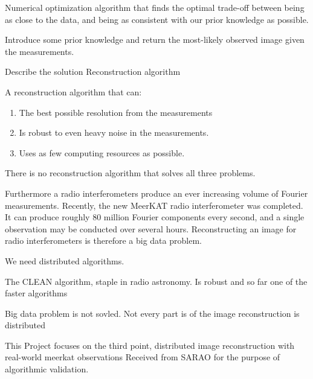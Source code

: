 Numerical optimization algorithm that finds the optimal trade-off between being as close to the data, and being as consistent with our prior knowledge as possible.

Introduce some prior knowledge and return the most-likely observed image given the measurements.

Describe the solution
Reconstruction algorithm


A reconstruction algorithm that can:
\begin{enumerate}
	\item The best possible resolution from the measurements
	\item Is robust to even heavy noise in the measurements.
	\item Uses as few computing resources as possible.
\end{enumerate}

There is no reconstruction algorithm that solves all three problems.

Furthermore a radio interferometers produce an ever increasing volume of Fourier measurements. Recently, the new MeerKAT radio interferometer was completed. It can produce roughly 80 million Fourier components every second, and a single observation may be conducted over several hours. Reconstructing an image for radio interferometers is therefore a big data problem.


We need distributed algorithms.

The CLEAN algorithm, staple in radio astronomy.
Is robust and so far one of the faster algorithms

Big data problem is not sovled. Not every part is of the image reconstruction is distributed


This Project focuses on the third point, distributed image reconstruction with real-world meerkat observations
Received from SARAO for the purpose of algorithmic validation.
